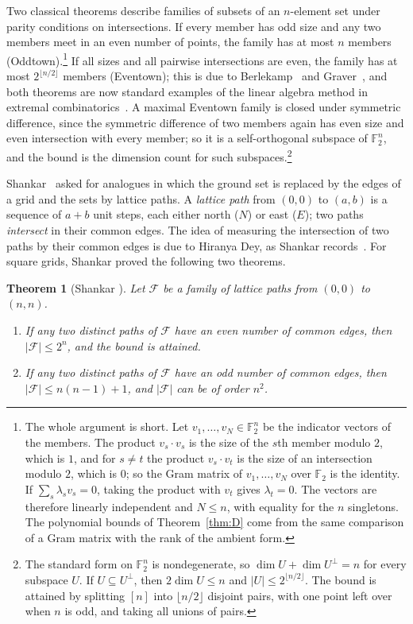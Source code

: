 \documentclass[11pt]{amsart}
\newtheorem*{shankarthm}{Theorem}
\theoremstyle{definition}
\theoremstyle{remark}
\numberwithin{equation}{section}
\newcommand{\F}{\mathbb{F}}
\newcommand{\cF}{\mathcal{F}}
\begin{document}
Two classical theorems describe families of subsets of an $n$-element set under parity conditions on intersections. If every member has odd size and any two members meet in an even number of points, the family has at most $n$ members (Oddtown).\footnote{The whole argument is short. Let $v_1,\dots,v_N\in\F_2^n$ be the indicator vectors of the members. The product $v_s\cdot v_s$ is the size of the $s$th member modulo $2$, which is $1$, and for $s\ne t$ the product $v_s\cdot v_t$ is the size of an intersection modulo $2$, which is $0$; so the Gram matrix of $v_1,\dots,v_N$ over $\F_2$ is the identity. If $\sum_s\lambda_sv_s=0$, taking the product with $v_t$ gives $\lambda_t=0$. The vectors are therefore linearly independent and $N\le n$, with equality for the $n$ singletons. The polynomial bounds of Theorem~\ref{thm:D} come from the same comparison of a Gram matrix with the rank of the ambient form.} If all sizes and all pairwise intersections are even, the family has at most $2^{\lfloor n/2\rfloor}$ members (Eventown); this is due to Berlekamp~\cite{Be} and Graver~\cite{Gr}, and both theorems are now standard examples of the linear algebra method in extremal combinatorics~\cite{FW,FO}. A maximal Eventown family is closed under symmetric difference, since the symmetric difference of two members again has even size and even intersection with every member; so it is a self-orthogonal subspace of $\F_2^n$, and the bound is the dimension count for such subspaces.\footnote{The standard form on $\F_2^n$ is nondegenerate, so $\dim U+\dim U^\perp=n$ for every subspace $U$. If $U\subseteq U^\perp$, then $2\dim U\le n$ and $|U|\le2^{\lfloor n/2\rfloor}$. The bound is attained by splitting $[n]$ into $\lfloor n/2\rfloor$ disjoint pairs, with one point left over when $n$ is odd, and taking all unions of pairs.}

Shankar~\cite{Sh} asked for analogues in which the ground set is replaced by the edges of a grid and the sets by lattice paths. A \emph{lattice path} from $(0,0)$ to $(a,b)$ is a sequence of $a+b$ unit steps, each either north ($N$) or east ($E$); two paths \emph{intersect} in their common edges. The idea of measuring the intersection of two paths by their common edges is due to Hiranya Dey, as Shankar records~\cite{Sh}. For square grids, Shankar proved the following two theorems.

\begin{shankarthm}[Shankar {\cite{Sh}}]
Let $\cF$ be a family of lattice paths from $(0,0)$ to $(n,n)$.
\begin{enumerate}[label=\textup{(\roman*)}]
\item If any two distinct paths of $\cF$ have an even number of common edges, then $|\cF|\le 2^n$, and the bound is attained.
\item If any two distinct paths of $\cF$ have an odd number of common edges, then $|\cF|\le n(n-1)+1$, and $|\cF|$ can be of order $n^2$.
\end{enumerate}
\end{shankarthm}
\end{document}
